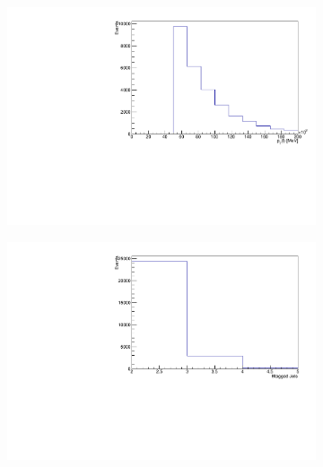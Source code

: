 \begin{figure}
  \begin{subfigure}{0.5\textwidth}
    \centering
    \includegraphics[width=\linewidth]{plots_and_txt/ttbar.mu_selected_/ttbar.mu_selected_lep_pt.pdf}
    \caption{}
    \label{fig:lep_pt}
  \end{subfigure}%
  \begin{subfigure}{0.5\textwidth}
    \centering
    \includegraphics[width=\linewidth]{plots_and_txt/ttbar.mu_selected_/ttbar.mu_selected_btagged.pdf}
    \caption{}
    \label{fig:btagged}
  \end{subfigure}%
  \newline
  \begin{subfigure}{0.5\textwidth}
    \centering

\end{subfigure}
\end{figure}
